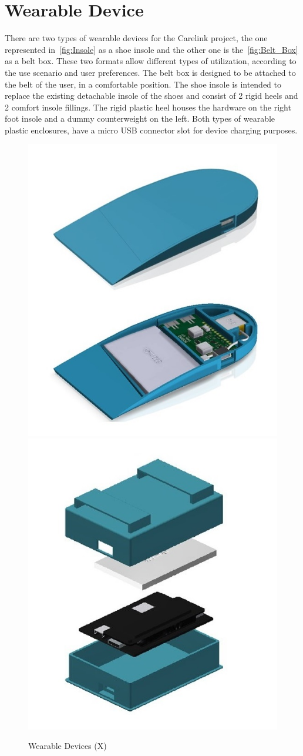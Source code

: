 \section{Wearable Device} %
\label{sec:Wearrable_Device}
There are two types of wearable devices for the Carelink project, the one represented in~\ref{fig:Insole} as a shoe insole and the other one is the~\ref{fig:Belt_Box} as a belt box. 
These two formats allow different types of utilization, according to the use scenario and user preferences.  
The belt box is designed to be attached to the belt of the user, in a comfortable position.
The shoe insole is intended to replace the existing detachable insole of the shoes and consist of 2 rigid heels and 2 comfort insole fillings. The rigid plastic heel houses the hardware on the right foot insole and a dummy counterweight on the left.
Both types of wearable plastic enclosures, have a micro USB connector slot for device charging purposes.
\begin{figure}[htbp]
  \centering
    {\includegraphics[width=0.45\linewidth]{Chapters/Figures/hardware11.jpg}}%
    {\includegraphics[width=0.4\linewidth]{Chapters/Figures/hardware2.jpg}}%
  \caption{Wearable Devices (X)}
  \label{fig:Wearable_Devices}
\end{figure}


